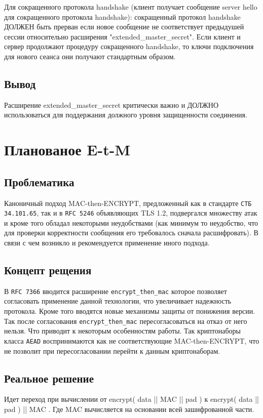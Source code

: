 Для сокращенного протокола handshake (клиент получает сообщение server hello для сокращенного протокола handshake): сокращенный протокол handshake ДОЛЖЕН быть прерван если новое сообщение не соответствует предыдушей сессии относительно расширения "extended\_master\_secret". Если клиент и сервер продолжают процедуру сокращенного handshake, то ключи подключения для нового сеанса они получают стандартным образом.
 
\subsection{Вывод}
Расширение extended\_master\_secret критически важно и ДОЛЖНО использоваться для поддержания должного уровня защищенности соединения.


\section{Планованое E-t-M}

\subsection{Проблематика}
Каноничный подход MAC-then-ENCRYPT, предложенный как в стандарте \texttt{СТБ 34.101.65}, так и в \texttt{RFC 5246} объявляющих TLS 1.2, подвергался множеству атак и кроме того обладал некоторыми неудобствами (как минимум то неудобство, что для проверки корректности сообщения его требовалось сначала расшифровать). В связи с чем возникло и рекомендуется применение иного подхода.

\verbatim
\subsection{Концепт рещения}
В \texttt{RFC 7366} вводится расширение \texttt{encrypt\_then\_mac} которое позволяет согласовать применение данной технологии, что увеличивает надежность протокола. Кроме того вводятся новые механизмы защиты от понижения версии. Так после согласования \texttt{encrypt\_then\_mac} пересогласоваться на отказ от него нельзя. Что приводит к некоторым особенностям работы. Так криптонаборы класса \texttt{AEAD} воспринимаются как не соответствующие MAC-then-ENCRYPT, что не позволит при пересогласовании перейти к данным криптонаборам.

\subsection{Реальное решение}
Идет переход при вычислении от encrypt( data || MAC || pad ) 
к encrypt( data || pad ) || MAC . Где MAC вычисляется на основании всей зашифрованной части. 

